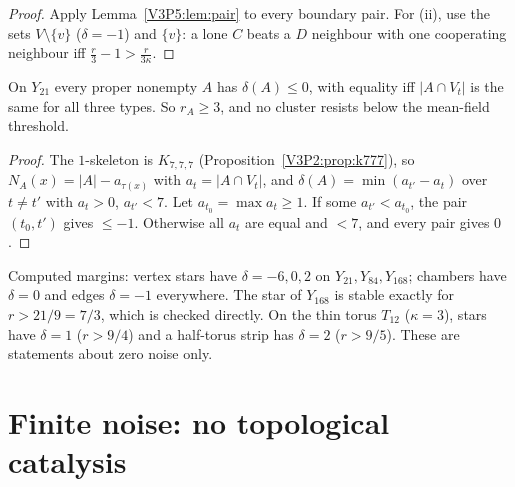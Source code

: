 \begin{proof}
Apply Lemma~\ref{V3P5:lem:pair} to every boundary pair. For (ii), use the sets $V\setminus\{v\}$
($\delta=-1$) and $\{v\}$: a lone $C$ beats a $D$ neighbour with one cooperating neighbour iff
$\frac r3-1>\frac r{3\kappa}$.
\end{proof}

\begin{proposition}\label{V3P5:prop:Y21}
On $Y_{21}$ every proper nonempty $A$ has $\delta(A)\le0$, with equality iff $|A\cap V_t|$ is
the same for all three types. So $r_A\ge3$, and no cluster resists below the mean-field
threshold.
\end{proposition}

\begin{proof}
The $1$-skeleton is $K_{7,7,7}$ (Proposition~\ref{V3P2:prop:k777}), so
$N_A(x)=|A|-a_{\tau(x)}$ with $a_t=|A\cap V_t|$, and $\delta(A)=\min(a_{t'}-a_t)$ over
$t\ne t'$ with $a_t>0$, $a_{t'}<7$. Let $a_{t_0}=\max a_t\ge1$. If some $a_{t'}<a_{t_0}$, the
pair $(t_0,t')$ gives $\le-1$. Otherwise all $a_t$ are equal and $<7$, and every pair gives
$0$.
\end{proof}

\begin{remark}\label{V3P5:rem:cages}
Computed margins: vertex stars have $\delta=-6,0,2$ on $Y_{21},Y_{84},Y_{168}$; chambers have
$\delta=0$ and edges $\delta=-1$ everywhere. The star of $Y_{168}$ is stable exactly for
$r>21/9=7/3$, which is checked directly. On the thin torus $T_{12}$ ($\kappa=3$), stars have
$\delta=1$ ($r>9/4$) and a half-torus strip has $\delta=2$ ($r>9/5$). These are statements
about zero noise only.
\end{remark}

\section{Finite noise: no topological catalysis}\label{V3P5:sec:mc}

